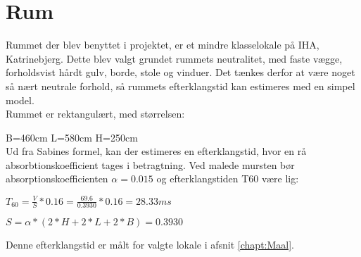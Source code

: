 \section{Rum}

Rummet der blev benyttet i projektet, er et mindre klasselokale på IHA, Katrinebjerg. 
Dette blev valgt grundet rummets neutralitet, med faste vægge, forholdsvist hårdt gulv, borde, stole og vinduer. Det tænkes derfor at være noget så nært neutrale forhold, så rummets efterklangstid kan estimeres med en simpel model. \\

Rummet er rektangulært, med størrelsen:

B=460cm \hspace{3cm}
L=580cm \hspace{3cm}
H=250cm\\

Ud fra Sabines formel, kan der estimeres en efterklangstid, hvor en rå absorbtionskoefficient tages i betragtning. 
Ved malede mursten bør absorptionskoefficienten $\alpha=0.015$ \cite{Attenuation} og efterklangstiden T60 være lig:

\(T_{60}=\frac{V}{S}*0.16=\frac{69.6}{0.3930}*0.16=28.33 ms\)

\(S=\alpha*(2*H+2*L+2*B)=0.3930\)

Denne efterklangstid er målt for valgte lokale i afsnit \ref{chapt:Maal}.
